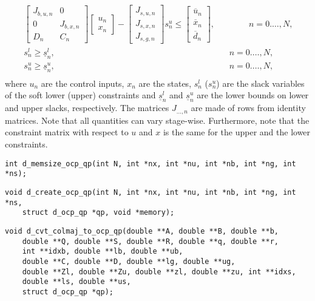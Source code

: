 \documentclass[a4paper]{report}
\begin{document}
\begin{align*}
& \quad \begin{bmatrix} J_{b,u,n} & 0 \\ 0 & J_{b,x,n} \\ D_n & C_n \end{bmatrix} \begin{bmatrix} u_n \\ x_n \end{bmatrix} - \begin{bmatrix} J_{s,u,n} \\ J_{s,x,n} \\ J_{s,g,n} \end{bmatrix} s^u_n \leq \begin{bmatrix} \overline u_n \\ \overline x_n \\ \overline d_n \end{bmatrix} , \qquad \qquad n=0.\dots,N, & & \\
& \quad s^l_n\geq \underline{s}^l_n, \qquad \qquad \qquad \qquad \qquad \qquad \qquad \qquad \qquad \qquad \,\,\,  n=0.\dots,N, & &\\
& \quad s^u_n\geq \underline{s}^u_n, \qquad \qquad \qquad \qquad \qquad \qquad \qquad \qquad \qquad \qquad \,\,\,  n=0.\dots,N, & &\\
\end{align*}
where $u_n$ are the control inputs, $x_n$ are the states, $s^l_n$ ($s^u_n$) are the slack variables of the soft lower (upper) constraints
and $\underline{s}^l_n$ and $\underline{s}^u_n$ are the lower bounds on lower and upper slacks, respectively.
The matrices $J_{\dots,n}$ are made of rows from identity matrices.
Note that all quantities can vary stage-wise.
Furthermore, note that the constraint matrix with respect to $u$ and $x$ is the same for the upper and the lower constraints.

\begin{verbatim}
int d_memsize_ocp_qp(int N, int *nx, int *nu, int *nb, int *ng, int *ns);
\end{verbatim}

\begin{verbatim}
void d_create_ocp_qp(int N, int *nx, int *nu, int *nb, int *ng, int *ns, 
    struct d_ocp_qp *qp, void *memory);
\end{verbatim}

\begin{verbatim}
void d_cvt_colmaj_to_ocp_qp(double **A, double **B, double **b, 
    double **Q, double **S, double **R, double **q, double **r, 
    int **idxb, double **lb, double **ub, 
    double **C, double **D, double **lg, double **ug, 
    double **Zl, double **Zu, double **zl, double **zu, int **idxs, 
    double **ls, double **us,
    struct d_ocp_qp *qp);
\end{verbatim}






\end{document}
